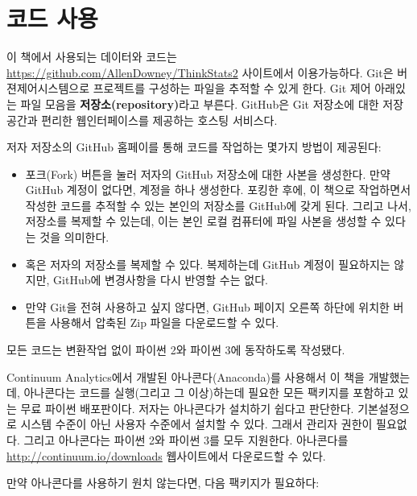 \section{코드 사용}
\label{code}

이 책에서 사용되는 데이터와 코드는 \url{https://github.com/AllenDowney/ThinkStats2} 사이트에서 이용가능하다. Git은 버젼제어시스템으로 프로젝트를 구성하는 파일을 추적할 수 있게 한다. Git 제어 아래있는 파일 모음을 
{\bf 저장소(repository)}라고 부른다. GitHub은 Git 저장소에 대한 저장공간과 편리한 웹인터페이스를 제공하는 호스팅 서비스다.

저자 저장소의 GitHub 홈페이를 통해 코드를 작업하는 몇가지 방법이 제공된다:

\begin{itemize}

\item 
포크(Fork) 버튼을 눌러 저자의 GitHub 저장소에 대한 사본을 생성한다. 만약 GitHub 계정이 없다면, 계정을 하나 생성한다. 포킹한 후에, 이 책으로 작업하면서 작성한 코드를 
추적할 수 있는 본인의 저장소를 GitHub에 갖게 된다. 그리고 나서, 저장소를 복제할 수 있는데, 이는 본인 로컬 컴퓨터에 파일 사본을 생성할 수 있다는 것을 의미한다.

\item 
혹은 저자의 저장소를 복제할 수 있다. 복제하는데 GitHub 계정이 필요하지는 않지만, GitHub에 변경사항을 다시 반영할 수는 없다.

\item 
만약 Git을 전혀 사용하고 싶지 않다면, GitHub 페이지 오른쪽 하단에 위치한 버튼을 사용해서 압축된 Zip 파일을 다운로드할 수 있다.

\end{itemize}

모든 코드는 변환작업 없이 파이썬 2와 파이썬 3에 동작하도록 작성됐다.

Continuum Analytics에서 개발된 아나콘다(Anaconda)를 사용해서 이 책을 개발했는데, 아나콘다는 코드를 실행(그리고 그 이상)하는데 필요한 모든 팩키지를 포함하고 있는 무료 파이썬 배포판이다.
저자는 아나콘다가 설치하기 쉽다고 판단한다. 기본설정으로 시스템 수준이 아닌 사용자 수준에서 설치할 수 있다. 그래서 관리자 권한이 필요없다. 그리고 아나콘다는 파이썬 2와 파이썬 3를 모두 지원한다.
아나콘다를 \url{http://continuum.io/downloads} 웹사이트에서 다운로드할 수 있다.

만약 아나콘다를 사용하기 원치 않는다면, 다음 팩키지가 필요하다:

